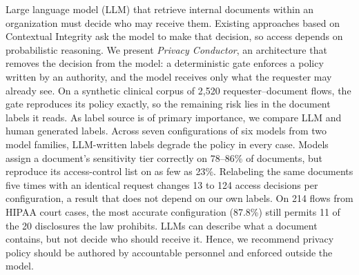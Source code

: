 Large language model (LLM) that retrieve internal documents within an organization must decide
who may receive them. Existing approaches based on Contextual Integrity ask the model to make that decision, so access depends on probabilistic reasoning. We present \emph{Privacy Conductor}, an architecture that removes the decision from the
model: a deterministic gate enforces a policy written by an authority, and the model receives only what the requester may already see. On a synthetic clinical
corpus of 2,520 requester--document flows, the gate reproduces its policy exactly, so the remaining risk lies in the document labels it reads. As label source is of primary importance, we compare LLM and human generated labels. Across seven configurations of six models from two model families, LLM-written labels degrade the policy in every case. Models assign a document's sensitivity
tier correctly on 78--86\% of documents, but reproduce its access-control list
on as few as 23\%. Relabeling the same documents five times with an identical request changes 13 to 124 access decisions per configuration, a result that
does not depend on our own labels. On 214 flows from HIPAA court cases, the most accurate configuration (87.8\%) still permits 11 of the 20 disclosures the
law prohibits. LLMs can describe what a document contains, but not decide who should receive it. Hence, we recommend privacy policy should be authored by accountable personnel and enforced outside the model.
